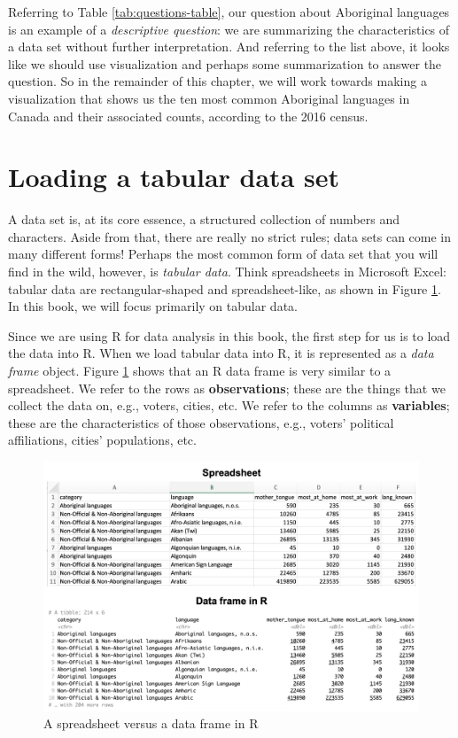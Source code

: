 \documentclass[
]{book}
\begin{document}
Referring to Table \ref{tab:questions-table}, our question about
Aboriginal languages is an example of a \emph{descriptive question}: we are
summarizing the characteristics of a data set without further interpretation.
And referring to the list above, it looks like we should use visualization
and perhaps some summarization to answer the question. So in the remainder
of this chapter, we will work towards making a visualization that shows
us the ten most common Aboriginal languages in Canada and their associated counts,
according to the 2016 census.

\hypertarget{loading-a-tabular-data-set}{%
\section{Loading a tabular data set}\label{loading-a-tabular-data-set}}

A data set is, at its core essence, a structured collection of numbers and characters.
Aside from that, there are really no strict rules; data sets can come in
many different forms! Perhaps the most common form of data set that you will
find in the wild, however, is \emph{tabular data}. Think spreadsheets in Microsoft Excel: tabular data are
rectangular-shaped and spreadsheet-like, as shown in Figure
\ref{fig:img-spreadsheet-vs-dataframe}. In this book, we will focus primarily on tabular data.

Since we are using R for data analysis in this book, the first step for us is to
load the data into R. When we load tabular data into
R, it is represented as a \emph{data frame} object. Figure
\ref{fig:img-spreadsheet-vs-dataframe} shows that an R data frame is very similar
to a spreadsheet. We refer to the rows as  \textbf{observations}; these are the things that we
collect the data on, e.g., voters, cities, etc. We refer to the columns as 
\textbf{variables}; these are the characteristics of those observations, e.g., voters' political
affiliations, cities' populations, etc.

\begin{figure}
\includegraphics[width=850pt]{img/spreadsheet_vs_dataframe} \caption{A spreadsheet versus a data frame in R}\label{fig:img-spreadsheet-vs-dataframe}
\end{figure}
\end{document}
